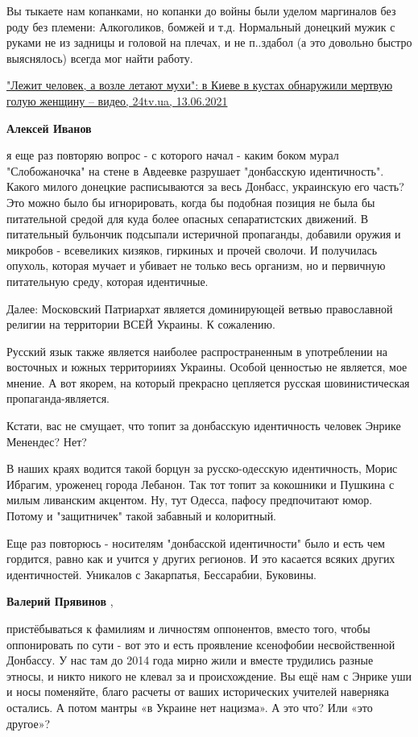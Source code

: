 \begin{itemize}
\begin{itemize}
Вы тыкаете нам копанками, но копанки до войны были уделом маргиналов без роду
без племени: Алкоголиков, бомжей и т.д. Нормальный донецкий мужик с руками не
из задницы и головой на плечах, и не п..здабол (а это довольно быстро
выяснялось) всегда мог найти работу.

\href{https://24tv.ua/kyivnews/ru/kieve-teligi-nashli-mertvuju-goluju-kriminalnye-novosti-ukrainy_n1655189}{%
"Лежит человек, а возле летают мухи": в Киеве в кустах обнаружили мертвую голую женщину – видео, 24tv.ua, %
13.06.2021%
}

\textbf{Алексей Иванов} 

я еще раз повторяю вопрос - с которого начал - каким боком мурал "Слобожаночка"
на стене в Авдеевке разрушает "донбасскую идентичность". Какого милого донецкие
расписываются за весь Донбасс, украинскую его часть? Это можно было бы
игнорировать, когда бы подобная позиция не была бы питательной средой для куда
более опасных сепаратистских движений. В питательный бульончик подсыпали
истеричной пропаганды, добавили оружия и микробов - всевеликих кизяков,
гиркиных и прочей сволочи. И получилась опухоль, которая мучает и убивает не
только весь организм, но и первичную питательную среду, которая идентичные.

Далее: Московский Патриархат является доминирующей ветвью православной религии
на территории ВСЕЙ Украины. К сожалению.

Русский язык также является наиболее распространенным в употреблении на
восточных и южных территорииях Украины. Особой ценностью не является, мое
мнение. А вот якорем, на который прекрасно цепляется русская шовинистическая
пропаганда-является.

Кстати, вас не смущает, что топит за донбасскую идентичность человек Энрике
Менендес? Нет?

В наших краях водится такой борцун за русско-одесскую идентичность, Морис
Ибрагим, уроженец города Лебанон. Так тот топит за кокошники и Пушкина с милым
ливанским акцентом. Ну, тут Одесса, пафосу предпочитают юмор. Потому и
"защитничек" такой забавный и колоритный.

Еще раз повторюсь - носителям "донбасской идентичности" было и есть чем
гордится, равно как и учится у других регионов. И это касается всяких других
идентичностей. Уникалов с Закарпатья, Бессарабии, Буковины.

\textbf{Валерий Прявинов} , 

пристёбываться к фамилиям и личностям оппонентов, вместо того, чтобы
оппонировать по сути - вот это и есть проявление ксенофобии несвойственной
Донбассу. У нас там до 2014 года мирно жили и вместе трудились разные этносы, и
никто никого не клевал за и происхождение. Вы ещё нам с Энрике уши и носы
поменяйте, благо расчеты от ваших исторических учителей наверняка остались. А
потом мантры «в Украине нет нацизма». А это что? Или «это другое»?


\end{itemize}
\end{itemize}

